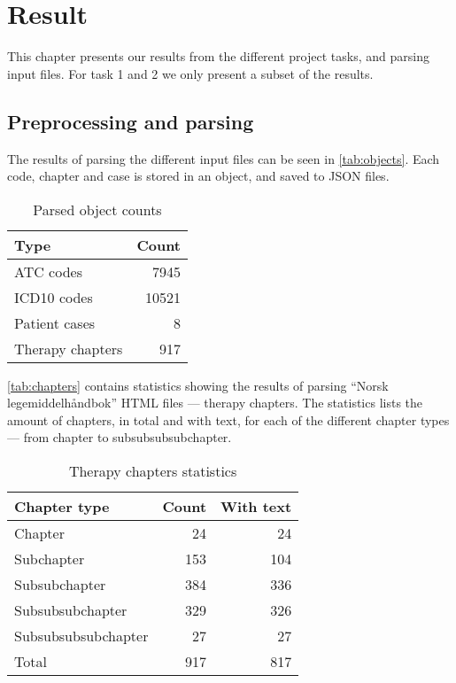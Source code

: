 \chapter{Result}
\label{cha:result}
This chapter presents our results from the different project tasks, and
parsing input files. For task 1 and 2 we only present a subset of the results.


\section{Preprocessing and parsing}
The results of parsing the different input files can be seen in
\autoref{tab:objects}. Each code, chapter and case is stored in an object,
and saved to JSON files.
\begin{table}[htbp] \footnotesize \center
\caption{Parsed object counts\label{tab:objects}}
\begin{tabular}{l r}
    \toprule
    Type & Count \\
    \midrule
	ATC codes & 7945 \\
	ICD10 codes & 10521 \\
	Patient cases & 8 \\
	Therapy chapters & 917 \\
	\bottomrule
\end{tabular}
\end{table}

\autoref{tab:chapters} contains statistics showing the results of parsing
``Norsk legemiddelhåndbok'' HTML files --- therapy chapters. The statistics
lists the amount of chapters, in total and with text, for each of the
different chapter types --- from chapter to subsubsubsubchapter.
\begin{table}[htbp] \footnotesize \center
\caption{Therapy chapters statistics\label{tab:chapters}}
\begin{tabular}{l r r}
    \toprule
    Chapter type & Count & With text \\
    \midrule
	Chapter & 24 & 24 \\
	Subchapter & 153 & 104 \\
	Subsubchapter & 384 & 336 \\
	Subsubsubchapter & 329 & 326 \\
	Subsubsubsubchapter & 27 & 27 \\
    \midrule
	Total & 917 & 817 \\
	\bottomrule
\end{tabular}
\end{table}

